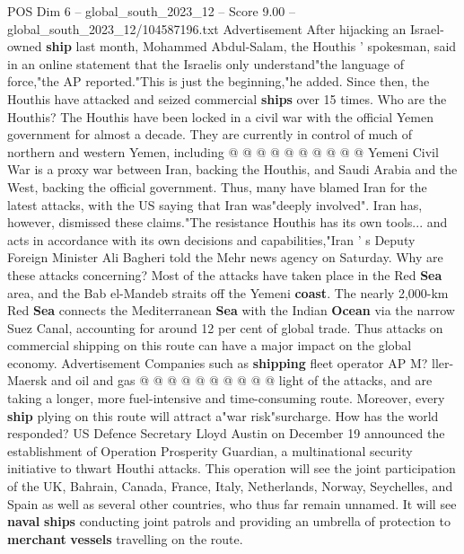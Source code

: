 \begin{textsample}{POS Dim 6 – global\_south\_2023\_12 – Score 9.00 – global\_south\_2023\_12/104587196.txt}
Advertisement After hijacking an Israel-owned \textbf{ship} last month, Mohammed Abdul-Salam, the Houthis ' spokesman, said in an online statement that the Israelis only understand"the language of force,"the AP reported."This is just the beginning,"he added.
Since then, the Houthis have attacked and seized commercial \textbf{ships} over 15 times.
Who are the Houthis?
The Houthis have been locked in a civil war with the official Yemen government for almost a decade.
They are currently in control of much of northern and western Yemen, including @ @ @ @ @ @ @ @ @ @ Yemeni Civil War is a proxy war between Iran, backing the Houthis, and Saudi Arabia and the West, backing the official government.
Thus, many have blamed Iran for the latest attacks, with the US saying that Iran was"deeply involved".
Iran has, however, dismissed these claims."The resistance Houthis has its own tools... and acts in accordance with its own decisions and capabilities,"Iran ' s Deputy Foreign Minister Ali Bagheri told the Mehr news agency on Saturday.
Why are these attacks concerning?
Most of the attacks have taken place in the Red \textbf{Sea} area, and the Bab el-Mandeb straits off the Yemeni \textbf{coast}.
The nearly 2,000-km Red \textbf{Sea} connects the Mediterranean \textbf{Sea} with the Indian \textbf{Ocean} via the narrow Suez Canal, accounting for around 12 per cent of global trade.
Thus attacks on commercial shipping on this route can have a major impact on the global economy.
Advertisement Companies such as \textbf{shipping} fleet operator AP M? ller-Maersk and oil and gas @ @ @ @ @ @ @ @ @ @ light of the attacks, and are taking a longer, more fuel-intensive and time-consuming route.
Moreover, every \textbf{ship} plying on this route will attract a"war risk"surcharge.
How has the world responded?
US Defence Secretary Lloyd Austin on December 19 announced the establishment of Operation Prosperity Guardian, a multinational security initiative to thwart Houthi attacks.
This operation will see the joint participation of the UK, Bahrain, Canada, France, Italy, Netherlands, Norway, Seychelles, and Spain as well as several other countries, who thus far remain unnamed.
It will see \textbf{naval} \textbf{ships} conducting joint patrols and providing an umbrella of protection to \textbf{merchant} \textbf{vessels} travelling on the route.

\end{textsample}
